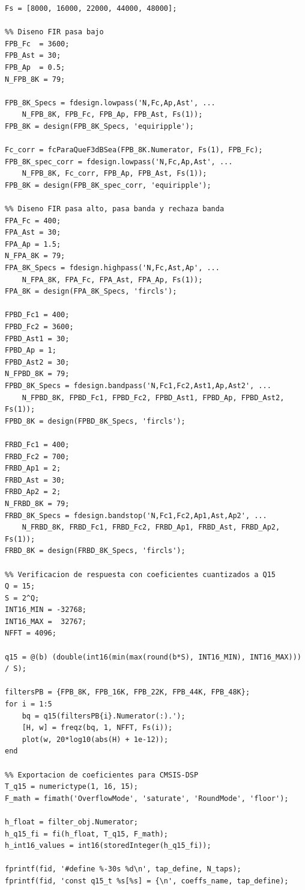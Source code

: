 \documentclass[12pt]{article}
\begin{document}
	\begin{lstlisting}[style=matlabstyle]
% Frecuencias de muestreo utilizadas
Fs = [8000, 16000, 22000, 44000, 48000];

%% Diseno FIR pasa bajo
FPB_Fc  = 3600;
FPB_Ast = 30;
FPB_Ap  = 0.5;
N_FPB_8K = 79;

FPB_8K_Specs = fdesign.lowpass('N,Fc,Ap,Ast', ...
    N_FPB_8K, FPB_Fc, FPB_Ap, FPB_Ast, Fs(1));
FPB_8K = design(FPB_8K_Specs, 'equiripple');

Fc_corr = fcParaQueF3dBSea(FPB_8K.Numerator, Fs(1), FPB_Fc);
FPB_8K_spec_corr = fdesign.lowpass('N,Fc,Ap,Ast', ...
    N_FPB_8K, Fc_corr, FPB_Ap, FPB_Ast, Fs(1));
FPB_8K = design(FPB_8K_spec_corr, 'equiripple');

%% Diseno FIR pasa alto, pasa banda y rechaza banda
FPA_Fc = 400;
FPA_Ast = 30;
FPA_Ap = 1.5;
N_FPA_8K = 79;
FPA_8K_Specs = fdesign.highpass('N,Fc,Ast,Ap', ...
    N_FPA_8K, FPA_Fc, FPA_Ast, FPA_Ap, Fs(1));
FPA_8K = design(FPA_8K_Specs, 'fircls');

FPBD_Fc1 = 400;
FPBD_Fc2 = 3600;
FPBD_Ast1 = 30;
FPBD_Ap = 1;
FPBD_Ast2 = 30;
N_FPBD_8K = 79;
FPBD_8K_Specs = fdesign.bandpass('N,Fc1,Fc2,Ast1,Ap,Ast2', ...
    N_FPBD_8K, FPBD_Fc1, FPBD_Fc2, FPBD_Ast1, FPBD_Ap, FPBD_Ast2, Fs(1));
FPBD_8K = design(FPBD_8K_Specs, 'fircls');

FRBD_Fc1 = 400;
FRBD_Fc2 = 700;
FRBD_Ap1 = 2;
FRBD_Ast = 30;
FRBD_Ap2 = 2;
N_FRBD_8K = 79;
FRBD_8K_Specs = fdesign.bandstop('N,Fc1,Fc2,Ap1,Ast,Ap2', ...
    N_FRBD_8K, FRBD_Fc1, FRBD_Fc2, FRBD_Ap1, FRBD_Ast, FRBD_Ap2, Fs(1));
FRBD_8K = design(FRBD_8K_Specs, 'fircls');

%% Verificacion de respuesta con coeficientes cuantizados a Q15
Q = 15;
S = 2^Q;
INT16_MIN = -32768;
INT16_MAX =  32767;
NFFT = 4096;

q15 = @(b) (double(int16(min(max(round(b*S), INT16_MIN), INT16_MAX))) / S);

filtersPB = {FPB_8K, FPB_16K, FPB_22K, FPB_44K, FPB_48K};
for i = 1:5
    bq = q15(filtersPB{i}.Numerator(:).');
    [H, w] = freqz(bq, 1, NFFT, Fs(i));
    plot(w, 20*log10(abs(H) + 1e-12));
end

%% Exportacion de coeficientes para CMSIS-DSP
T_q15 = numerictype(1, 16, 15);
F_math = fimath('OverflowMode', 'saturate', 'RoundMode', 'floor');

h_float = filter_obj.Numerator;
h_q15_fi = fi(h_float, T_q15, F_math);
h_int16_values = int16(storedInteger(h_q15_fi));

fprintf(fid, '#define %-30s %d\n', tap_define, N_taps);
fprintf(fid, 'const q15_t %s[%s] = {\n', coeffs_name, tap_define);
	\end{lstlisting}
	
\end{document}
